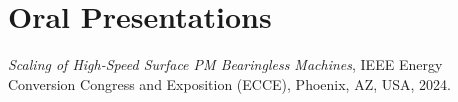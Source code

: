\section{\sc Oral Presentations}

\begin{description}[font=\normalfont, labelwidth=1.5em, leftmargin=2em, itemsep=0.5em]

\item[O1] \emph{Scaling of High-Speed Surface PM Bearingless Machines}, IEEE Energy Conversion Congress and Exposition (ECCE), Phoenix, AZ, USA, 2024.

\end{description}

\endinput
